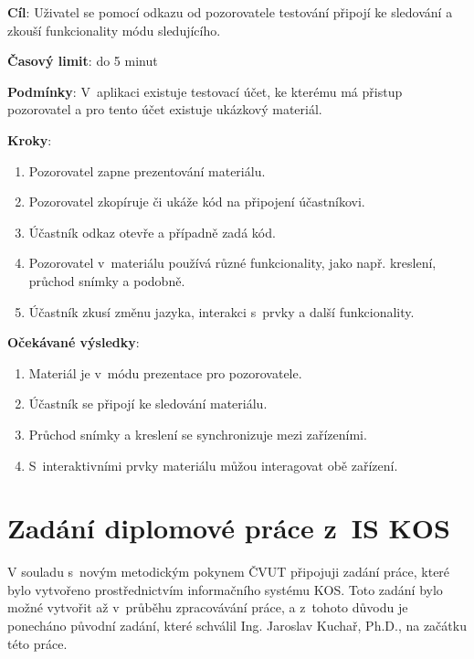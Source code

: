 \vspace{1em}

\textbf{Cíl}: Uživatel se pomocí odkazu od pozorovatele testování připojí ke sledování a zkouší funkcionality módu sledujícího.

\textbf{Časový limit}: do 5 minut

\textbf{Podmínky}:  V~aplikaci existuje testovací účet, ke kterému má přistup pozorovatel a pro tento účet existuje ukázkový materiál. 

\textbf{Kroky}:

\begin{enumerate}[leftmargin=1.4cm]
    \item Pozorovatel zapne prezentování materiálu.
    \item Pozorovatel zkopíruje či ukáže kód na připojení účastníkovi.
    \item Účastník odkaz otevře a případně zadá kód.
    \item Pozorovatel v~materiálu používá různé funkcionality, jako např. kreslení, průchod snímky a podobně.
    \item Účastník zkusí změnu jazyka, interakci s~prvky a další funkcionality.
\end{enumerate}

\textbf{Očekávané výsledky}:

\begin{enumerate}[leftmargin=1.4cm]
    \item Materiál je v~módu prezentace pro pozorovatele.
    \item Účastník se připojí ke sledování materiálu.
    \item Průchod snímky a kreslení se synchronizuje mezi zařízeními.
    \item S~interaktivními prvky materiálu můžou interagovat obě zařízení.
\end{enumerate}

\chapter{Zadání diplomové práce z~IS KOS}

V souladu s~novým metodickým pokynem ČVUT připojuji zadání práce, které bylo vytvořeno prostřednictvím informačního systému KOS. 
Toto zadání bylo možné vytvořit až v~průběhu zpracovávání práce, a z~tohoto důvodu je ponecháno původní zadání, které schválil Ing. Jaroslav Kuchař, Ph.D., na začátku této práce.

